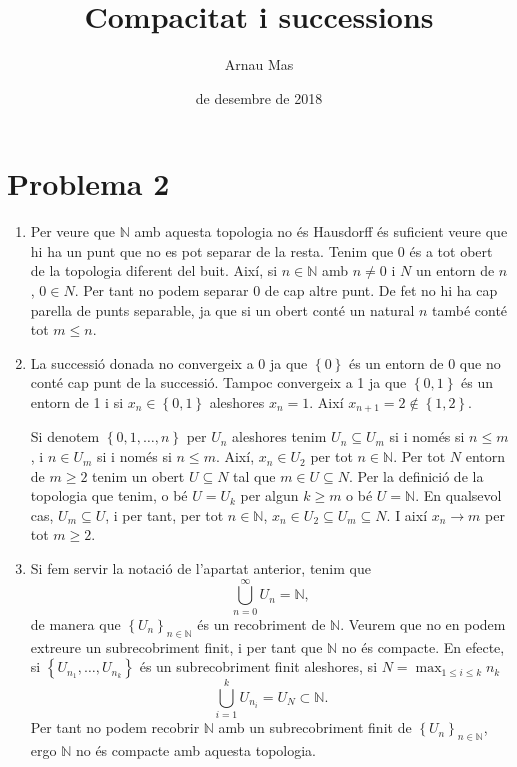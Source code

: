 \documentclass[12pt]{article}
\title{\sffamily {\bfseries Seminari 3:} Compacitat i successions}
\author{\sffamily Arnau Mas}
\date{\sffamily 11 de desembre de 2018}
\numberwithin{table}{section}
\numberwithin{figure}{section}
\numberwithin{equation}{section}
\newcommand{\N}{\mathbb{N}}
\newcommand{\set}[1]{\left\{ #1\right\}}
\begin{document}
\maketitle

\section*{Problema 2}
\begin{enumerate}[label=(\alph*), font=\bfseries \sffamily, wide, labelwidth=!, labelindent=0pt]
	\item Per veure que \( \N \) amb aquesta topologia no és Hausdorff és suficient veure que hi ha un punt que no es pot separar de la resta. Tenim que 0 és a tot obert de la topologia diferent del buit. Així, si \( n \in \N \) amb \( n \neq 0 \) i \( N \) un entorn  de \( n \), \( 0 \in N \). Per tant no podem separar 0 de cap altre punt. De fet no hi ha cap parella de punts separable, ja que si un obert conté un natural \( n \) també conté tot \( m \leq n \).

	\item La successió donada no convergeix a 0 ja que \( \set{0} \) és un entorn de 0 que no conté cap punt de la successió. Tampoc convergeix a 1 ja que \( \set{0,1} \) és un entorn de 1 i si \( x_n \in \set{0,1} \) aleshores \( x_{n} = 1 \). Així \( x_{n+1} = 2 \notin \set{1,2} \).

Si denotem \( \set{0,1,\dots,n} \) per \( U_n \) aleshores tenim \( U_n \subseteq U_{m} \) si i només si \( n \leq m \), i \( n \in U_m \) si i només si \( n \leq m \). Així, \( x_n \in U_2 \) per tot \( n \in \N \). Per tot \( N \) entorn de \( m \geq 2 \) tenim un obert \( U \subseteq N \) tal que \( m \in U \subseteq N \). Per la definició de la topologia que tenim, o bé \( U = U_k \) per algun \( k \geq m \) o bé \( U = \N \). En qualsevol cas, \( U_m \subseteq U \), i per tant, per tot \( n \in \N \), \( x_n \in U_2 \subseteq U_m \subseteq N \). I així \( x_n \to m \) per tot \( m \geq 2 \).

\item Si fem servir la notació de l'apartat anterior, tenim que 
	\begin{equation*}
	\bigcup_{n = 0}^\infty U_n = \N,
	\end{equation*}
	de manera que \( \set{U_n}_{n \in \N} \) és un recobriment de \( \N \). Veurem que no en podem extreure un subrecobriment finit, i per tant que \( \N \) no és compacte. En efecte, si \( \set{U_{n_1}, \dots, U_{n_k}} \) és un subrecobriment finit aleshores, si \( N = \max_{1 \leq i \leq k} n_k \)
	\begin{equation*}
	\bigcup_{i = 1}^k U_{n_i} = U_N \subset \N.
	\end{equation*}
	Per tant no podem recobrir \( \N \) amb un subrecobriment finit de \( \set{U_n}_{n \in \N} \), ergo \( \N \) no és compacte amb aquesta topologia. 
\end{enumerate}
\end{document}
